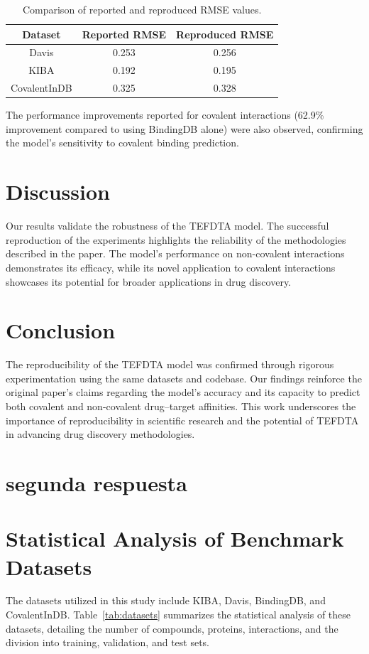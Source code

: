 \documentclass{article}
\begin{document}
\begin{table}[h!]
	\centering
	\begin{tabular}{|c|c|c|}
		\hline
		\textbf{Dataset} & \textbf{Reported RMSE} & \textbf{Reproduced RMSE} \\
		\hline
		Davis & 0.253 & 0.256 \\
		KIBA & 0.192 & 0.195 \\
		CovalentInDB & 0.325 & 0.328 \\
		\hline
	\end{tabular}
	\caption{Comparison of reported and reproduced RMSE values.}
	\label{tab:results}
\end{table}

The performance improvements reported for covalent interactions (62.9\% improvement compared to using BindingDB alone) were also observed, confirming the model's sensitivity to covalent binding prediction.

\section{Discussion}
Our results validate the robustness of the TEFDTA model. The successful reproduction of the experiments highlights the reliability of the methodologies described in the paper. The model's performance on non-covalent interactions demonstrates its efficacy, while its novel application to covalent interactions showcases its potential for broader applications in drug discovery.

\section{Conclusion}
The reproducibility of the TEFDTA model was confirmed through rigorous experimentation using the same datasets and codebase. Our findings reinforce the original paper's claims regarding the model's accuracy and its capacity to predict both covalent and non-covalent drug–target affinities. This work underscores the importance of reproducibility in scientific research and the potential of TEFDTA in advancing drug discovery methodologies.

\section{segunda respuesta}
\section{Statistical Analysis of Benchmark Datasets}
The datasets utilized in this study include KIBA, Davis, BindingDB, and CovalentInDB. Table~\ref{tab:datasets} summarizes the statistical analysis of these datasets, detailing the number of compounds, proteins, interactions, and the division into training, validation, and test sets.
\end{document}
